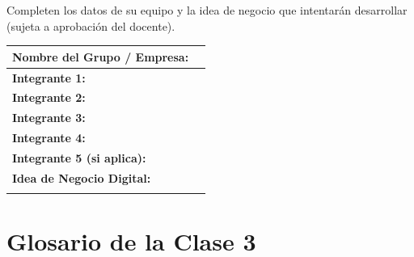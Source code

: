 \documentclass[12pt,a4paper]{article}
\renewcommand{\arraystretch}{1.25}
\begin{document}
\begin{cajaActividad}[title={Registro del Grupo}]
Completen los datos de su equipo y la idea de negocio que intentar\'an desarrollar (sujeta a aprobaci\'on del docente).

\vspace{6pt}
\renewcommand{\arraystretch}{1.6}
\begin{tabularx}{\textwidth}{|>{\bfseries}p{4.5cm}|X|}
\hline
\textbf{Nombre del Grupo / Empresa:} & \hrulefill \\[6pt]
\hline
\textbf{Integrante 1:} & \hrulefill \\[6pt]
\hline
\textbf{Integrante 2:} & \hrulefill \\[6pt]
\hline
\textbf{Integrante 3:} & \hrulefill \\[6pt]
\hline
\textbf{Integrante 4:} & \hrulefill \\[6pt]
\hline
\textbf{Integrante 5 (si aplica):} & \hrulefill \\[6pt]
\hline
\textbf{Idea de Negocio Digital:} & \\
\multicolumn{2}{|p{\dimexpr\textwidth-2\tabcolsep-2\arrayrulewidth}|}{\vspace{0.3cm} \hrulefill \vspace{0.3cm} \hrulefill \vspace{0.3cm} \hrulefill \vspace{0.3cm}} \\[6pt]
\hline
\end{tabularx}
\end{cajaActividad}

\newpage
\section{Glosario de la Clase 3}
\end{document}
